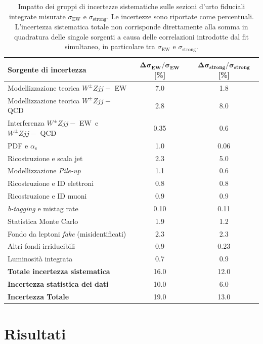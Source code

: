 \documentclass[11pt]{article}
\newcommand{\wzjjew}{$W^\pm Z jj-$ EW}
\newcommand{\wzjjqcd}{$W^\pm Z jj-$ QCD}
\begin{document}
\begin{table}[t]
\centering
\renewcommand{\arraystretch}{1.3}
\begin{tabular}{l c c}
\hline
\textbf{Sorgente di incertezza} & $\boldsymbol{\Delta\sigma_{\text{EW}} / \sigma_{\text{EW}}}$ [\%] & $\boldsymbol{\Delta\sigma_{\text{strong}} / \sigma_{\text{strong}}}$ [\%] \\
\hline
Modellizzazione teorica \wzjjew & 7.0 & 1.8 \\
Modellizzazione teorica \wzjjqcd & 2.8 & 8.0 \\
Interferenza \wzjjew\ e \wzjjqcd & 0.35 & 0.6 \\
PDF e $\alpha_{\mathrm{s}}$ & 1.0 & 0.06 \\
\hline
Ricostruzione e scala jet & 2.3 & 5.0 \\
Modellizzazione \textit{Pile-up} & 1.1 & 0.6 \\
Ricostruzione e ID elettroni & 0.8 & 0.8 \\
Ricostruzione e ID muoni & 0.9 & 0.9 \\
\textit{b-tagging} e mistag rate & 0.10 & 0.11 \\
Statistica Monte Carlo & 1.9 & 1.2 \\
Fondo da leptoni \textit{fake} (misidentificati) & 2.3 & 2.3 \\
Altri fondi irriducibili & 0.9 & 0.23 \\
\hline
Luminosità integrata & 0.7 & 0.9 \\
\hline
\textbf{Totale incertezza sistematica} & 16.0 & 12.0 \\
\textbf{Incertezza statistica dei dati} & 10.0 & 6.0 \\
\hline
\textbf{Incertezza Totale} & 19.0 & 13.0 \\
\hline
\end{tabular}
\caption{Impatto dei gruppi di incertezze sistematiche sulle sezioni d'urto fiduciali integrate misurate $\sigma_{\text{EW}}$ e $\sigma_{\text{strong}}$. Le incertezze sono riportate come percentuali. L'incertezza sistematica totale non corrisponde direttamente alla somma in quadratura delle singole sorgenti a causa delle correlazioni introdotte dal fit simultaneo, in particolare tra $\sigma_{\text{EW}}$ e $\sigma_{\text{strong}}$.}
\label{table:sysOnMu_summary}
\end{table}


\section{Risultati}
\label{sec:xsection_results}
\end{document}
